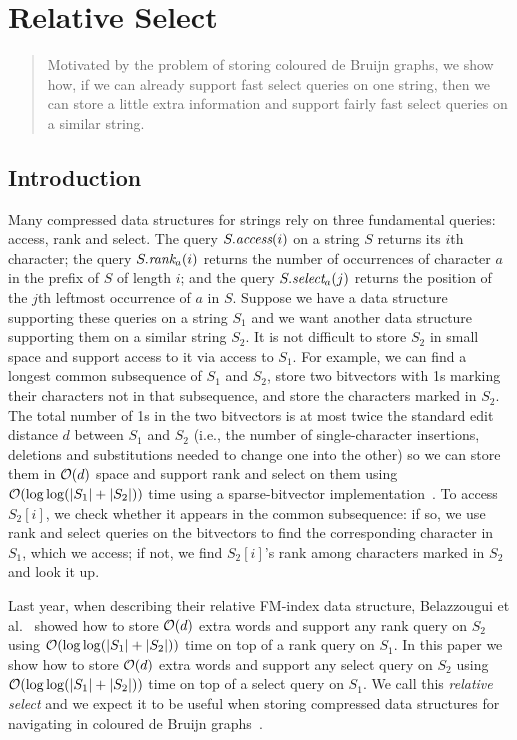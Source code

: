 \chapter{Relative Select}\label{ch:rel}

\begin{quote}
Motivated by the problem of storing coloured de Bruijn graphs, we show how, if we can already support fast select queries on one string, then we can store a little extra information and support fairly fast select queries on a similar string.
\end{quote}

\section{Introduction}
\label{rs-sec:introduction}

Many compressed data structures for strings rely on three fundamental queries: access, rank and select.  The query \(S.\textit{access} (i)\) on a string $S$ returns its $i$th character; the query \(S.\textit{rank}_a (i)\) returns the number of occurrences of character $a$ in the prefix of $S$ of length $i$; and the query \(S.\textit{select}_a (j)\) returns the position of the $j$th leftmost occurrence of $a$ in $S$.  Suppose we have a data structure supporting these queries on a string $S_1$ and we want another data structure supporting them on a similar string $S_2$.  It is not difficult to store $S_2$ in small space and support access to it via access to $S_1$.  For example, we can find a longest common subsequence of $S_1$ and $S_2$, store two bitvectors with 1s marking their characters not in that subsequence, and store the characters marked in $S_2$.  The total number of 1s in the two bitvectors is at most twice the standard edit distance $d$ between $S_1$ and $S_2$ (i.e., the number of single-character insertions, deletions and substitutions needed to change one into the other) so we can store them in $\mathcal{O}\!\left( d \right)$ space and support rank and select on them using $\mathcal{O}\!\left( \log \log (|S_1| + |S_2|) \right)$ time using a sparse-bitvector implementation~\cite{GBMP14}.  To access \(S_2 [i]\), we check whether it appears in the common subsequence: if so, we use rank and select queries on the bitvectors to find the corresponding character in $S_1$, which we access; if not, we find \(S_2 [i]\)'s rank among characters marked in $S_2$ and look it up.

Last year, when describing their relative FM-index data structure, Belazzougui et al.~\cite{BGGMS14} showed how to store $\mathcal{O}\!\left( d \right)$ extra words and support any rank query on $S_2$ using $\mathcal{O}\!\left( \log \log (|S_1| + |S_2|) \right)$ time on top of a rank query on $S_1$.  In this paper we show how to store $\mathcal{O}\!\left( d \right)$ extra words and support any select query on $S_2$ using $\mathcal{O}\!\left( \log \log (|S_1| + |S_2|) \right)$ time on top of a select query on $S_1$.  We call this {\em relative select} and we expect it to be useful when storing compressed data structures for navigating in coloured de Bruijn graphs~\cite{ICTFM12}.

